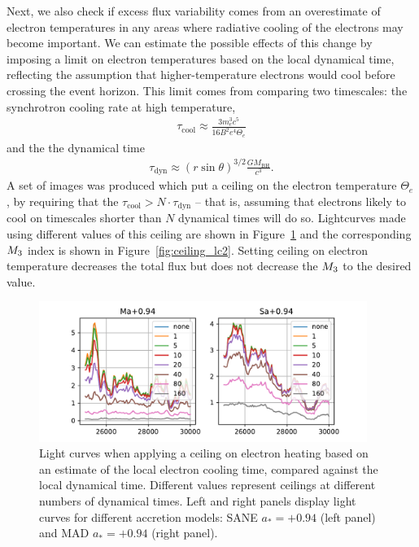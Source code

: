 Next, we also check if excess flux variability comes from an overestimate of electron temperatures in any areas where radiative cooling of the electrons may become important. We can estimate the possible effects of this change by imposing a limit on electron temperatures based on the local dynamical time, reflecting the assumption that higher-temperature electrons would cool before crossing the event horizon.
This limit comes from comparing two timescales: the synchrotron cooling rate at high temperature,
\begin{align}
    \tau_\mathrm{cool} \approx \frac{3 m_e^3 c^5}{16 B^2 e^4 \Theta_e}
\end{align}
and the the dynamical time
\begin{align}
  \tau_\mathrm{dyn} \approx \left( r \sin{\theta} \right)^{3/2} \frac{G M_\mathrm{BH}}{c^3}.
\end{align}
A set of images was produced which put a ceiling on the electron temperature $\Theta_e$, by requiring that the $\tau_\mathrm{cool} > N \cdot \tau_\mathrm{dyn}$ -- that is, assuming that electrons likely to cool on timescales shorter than $N$ dynamical times will do so. Lightcurves made using different values of this ceiling are shown in Figure~\ref{fig:ceiling_lc1} and the corresponding $M_{3}$ index is shown in Figure~\ref{fig:ceiling_lc2}. Setting ceiling on electron temperature decreases the total flux but does not decrease the $M_{3}$ to the desired value.
\begin{figure}
\centering
\includegraphics[width=0.95\textwidth]{figures/ctcut_lightcurves.pdf}
\caption{Light curves when applying a ceiling on electron heating based on an estimate of the local electron cooling time, compared against the local dynamical time. Different values represent ceilings at different numbers of dynamical times. Left and right panels display light curves for different accretion models: SANE $a_*=+0.94$ (left panel) and MAD $a_*=+0.94$ (right panel).}
\label{fig:ceiling_lc1}
\end{figure}

